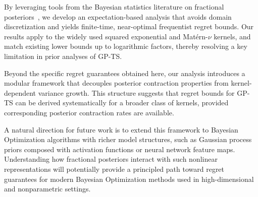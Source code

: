 \documentclass[final,12pt]{colt2026} %
\begin{document}
By leveraging tools from the Bayesian statistics literature on fractional posteriors~\citep{bhattacharya2019bayesian}, we develop an expectation-based analysis that avoids domain discretization and yields finite-time, near-optimal frequentist regret bounds. Our results apply to the widely used squared exponential and Mat\'{e}rn-$\nu$ kernels, and match existing lower bounds up to logarithmic factors, thereby resolving a key limitation in prior analyses of GP-TS.

Beyond the specific regret guarantees obtained here, our analysis introduces a modular framework that decouples posterior contraction properties from kernel-dependent variance growth. This structure suggests that regret bounds for GP-TS can be derived systematically for a broader class of kernels, provided corresponding posterior contraction rates are available.

A natural direction for future work is to extend this framework to Bayesian Optimization algorithms with richer model structures, such as Gaussian process priors composed with activation functions or neural network feature maps. Understanding how fractional posteriors interact with such nonlinear representations will potentially provide a principled path toward regret guarantees for modern Bayesian Optimization methods used in high-dimensional and nonparametric settings.

  
\end{document}
